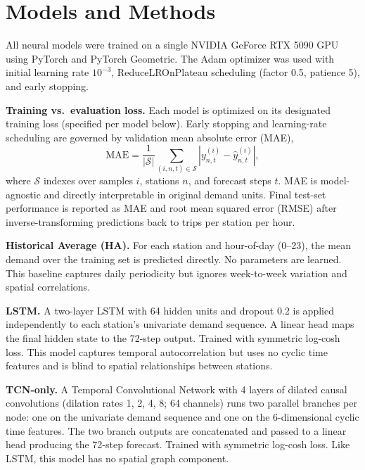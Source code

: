 \documentclass[12pt]{article}
\begin{document}
\section{Models and Methods}

All neural models were trained on a single NVIDIA GeForce RTX 5090 GPU using
PyTorch and PyTorch Geometric. The Adam optimizer was used with initial learning rate
$10^{-3}$, ReduceLROnPlateau scheduling (factor 0.5, patience 5), and early stopping.

\textbf{Training vs.\ evaluation loss.}
Each model is optimized on its designated training loss (specified per model below).
Early stopping and learning-rate scheduling are governed by validation
mean absolute error (MAE),
\[
  \mathrm{MAE} = \frac{1}{|\mathcal{S}|}\sum_{(i,n,t)\in\mathcal{S}} |y_{n,t}^{(i)} - \hat{y}_{n,t}^{(i)}|,
\]
where $\mathcal{S}$ indexes over samples $i$, stations $n$, and forecast steps $t$.
MAE is model-agnostic and directly interpretable in original demand units.
Final test-set performance is reported as MAE and root mean squared error
(RMSE) after inverse-transforming predictions back to trips per station per hour.

\textbf{Historical Average (HA).}
For each station and hour-of-day (0--23), the mean demand over the training set is
predicted directly. No parameters are learned. This baseline captures daily periodicity
but ignores week-to-week variation and spatial correlations.

\textbf{LSTM.}
A two-layer LSTM with 64 hidden units and dropout 0.2 is applied independently to
each station's univariate demand sequence.
A linear head maps the final hidden state to the 72-step output.
Trained with symmetric log-cosh loss.
This model captures temporal autocorrelation but uses no cyclic time features and is
blind to spatial relationships between stations.


\textbf{TCN-only.}
A Temporal Convolutional Network with 4 layers of dilated causal convolutions
(dilation rates 1, 2, 4, 8; 64 channels) runs two parallel branches per node:
one on the univariate demand sequence and one on the 6-dimensional cyclic time features.
The two branch outputs are concatenated and passed to a linear head producing the
72-step forecast. Trained with symmetric log-cosh loss.
Like LSTM, this model has no spatial graph component.
\end{document}

